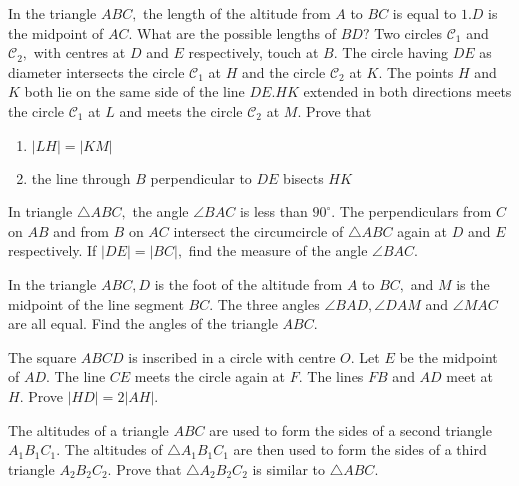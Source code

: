 \documentclass{pset}
\begin{document}
\begin{problems}
\begin{problem}[IrMO 2015 Q1]
    In the triangle \(A B C,\) the length of the altitude from \(A\) to \(B C\) is equal to \(1 . D\) is the midpoint of \(A C .\) What are the possible lengths of \(B D ?\)
    Two circles \(\mathcal{C}_{1}\) and \(\mathcal{C}_{2},\) with centres at \(D\) and \(E\) respectively, touch at \(B .\) The circle having \(D E\) as diameter intersects the circle \(\mathcal{C}_{1}\) at \(H\) and the circle \(\mathcal{C}_{2}\) at \(K .\) The points \(H\) and \(K\) both lie on the same side of the line \(D E . H K\) extended in both directions meets the circle \(\mathcal{C}_{1}\) at \(L\) and meets the circle \(\mathcal{C}_{2}\) at \(M .\) Prove that
\begin{enumerate}
    \item \(|L H|=|K M|\)
    \item the line through \(B\) perpendicular to \(D E\) bisects \(H K\)    
\end{enumerate}
\end{problem}

\begin{problem}[IrMO 2015 Q8]
    In triangle \(\triangle A B C,\) the angle \(\angle B A C\) is less than \(90^{\circ} .\) The perpendiculars from \(C\) on \(A B\) and from \(B\) on \(A C\) intersect the circumcircle of \(\triangle A B C\) again at \(D\) and \(E\) respectively. If \(|D E|=|B C|,\) find the measure of the angle \(\angle B A C .\)
\end{problem}

\begin{problem}[IrMO 2014 Q3]
    In the triangle \(A B C, D\) is the foot of the altitude from \(A\) to \(B C,\) and \(M\) is the midpoint of the line segment \(B C .\) The three angles \(\angle B A D, \angle D A M\) and \(\angle M A C\) are all equal. Find the angles of the triangle \(A B C\).
\end{problem}

\begin{problem}[IrMO 2014 Q7]
    The square \(A B C D\) is inscribed in a circle with centre \(O .\) Let \(E\) be the midpoint
    of \(A D .\) The line \(C E\) meets the circle again at \(F .\) The lines \(F B\) and \(A D\) meet at
    \(H .\) Prove \(|H D|=2|A H|\).
\end{problem}

\begin{problem}[IrMO 2013 Q3]
    The altitudes of a triangle \(A B C\) are used to form the sides of a second triangle \(A_{1} B_{1} C_{1} .\) The altitudes of \(\triangle A_{1} B_{1} C_{1}\) are then used to form the sides of a third triangle \(A_{2} B_{2} C_{2} .\) Prove that \(\triangle A_{2} B_{2} C_{2}\) is similar to \(\triangle A B C .\)
\end{problem}


\end{problems}
\end{document}
